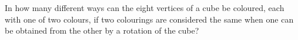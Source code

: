 In how many different ways can the eight vertices of a cube be coloured, each with one of two colours, if two colourings are considered the same when one can be obtained from the other by a rotation of the cube?
